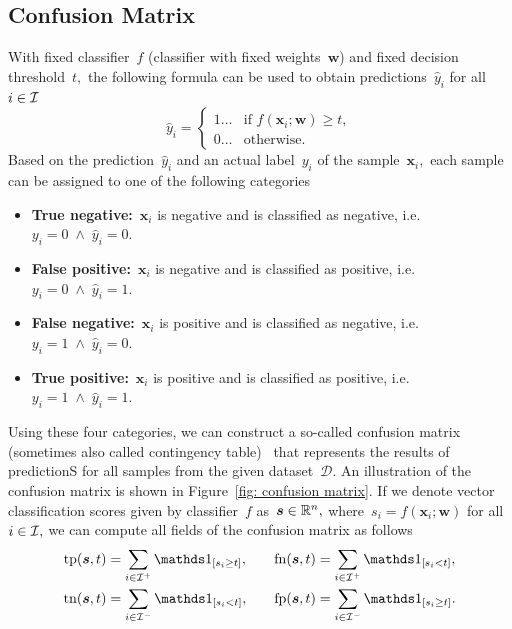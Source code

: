 \subsection{Confusion Matrix}
With fixed classifier~$f$ (classifier with fixed weights~$\bm{w}$) and fixed decision threshold~$t,$ the following formula can be used to obtain predictions~$\hat{y}_i$ for all~$i \in \mathcal{I}$
\begin{equation*}
  \hat{y}_i = \begin{cases}
    1 \ldots & \text{if } f(\bm{x}_i; \bm{w}) \ge t, \\
    0 \ldots & \text{otherwise.}
  \end{cases}
\end{equation*}
Based on the prediction~$\hat{y}_i$ and an actual label~$y_i$ of the sample~$\bm{x}_i,$ each sample can be assigned to one of the following categories
\begin{itemize}
  \item \textbf{True negative:}~$\bm{x}_i$ is negative and is classified as negative, i.e.~$y_i = 0 \; \land \; \hat{y}_i = 0.$
  \item \textbf{False positive:}~$\bm{x}_i$ is negative and is classified as positive, i.e.~$y_i = 0 \; \land \; \hat{y}_i = 1.$
  \item \textbf{False negative:}~$\bm{x}_i$ is positive and is classified as negative, i.e.~$y_i = 1 \; \land \; \hat{y}_i = 0.$
  \item \textbf{True positive:}~$\bm{x}_i$ is positive and is classified as positive, i.e.~$y_i = 1 \; \land \; \hat{y}_i = 1.$
\end{itemize}
Using these four categories, we can construct a so-called confusion matrix (sometimes also called contingency table)~\cite{fawcett2006introduction} that represents the results of predictionS for all samples from the given dataset~$\mathcal{D}$. An illustration of the confusion matrix is shown in Figure~\ref{fig: confusion matrix}. If we denote vector classification scores given by classifier~$f$ as~$\bm{s} \in \mathbb{R}^n,$ where~$s_i = f(\bm{x}_i; \bm{w})$ for all~$i \in \mathcal{I},$ we can compute all fields of the confusion matrix as follows
\begin{equation}\label{eq: confusion counts}
  \begin{aligned}
    \tp(\bm{s}, t) & = \sum_{i \in \I^+}\Iverson{s_i \ge t}, & \quad
    \fn(\bm{s}, t) & = \sum_{i \in \I^+}\Iverson{s_i < t}, \\
    \tn(\bm{s}, t) & = \sum_{i \in \I^-}\Iverson{s_i < t}, & \quad
    \fp(\bm{s}, t) & = \sum_{i \in \I^-}\Iverson{s_i \ge t}.
  \end{aligned}
\end{equation}
